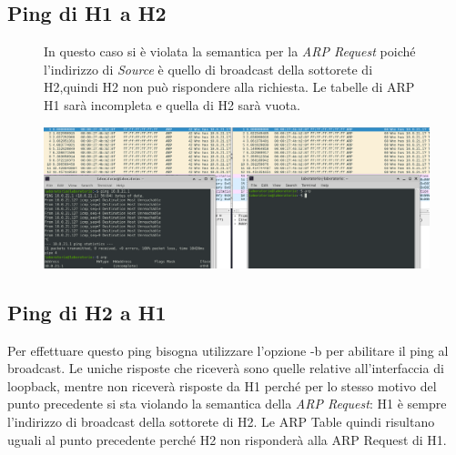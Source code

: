 \documentclass{article}
\begin{document}
 \subsection{Ping di H1 a H2}

 \begin{figure}[!htb]
    \begin{minipage}{0.2\textwidth}
        In questo caso si è violata la semantica per la \textit{ARP Request} poiché l’indirizzo di \textit{Source} è quello di broadcast della sottorete di H2,quindi H2 non può rispondere alla richiesta.
        Le tabelle di ARP H1 sarà incompleta e quella di H2 sarà vuota.  
    \end{minipage}\hfill
    \begin{minipage}{0.78\textwidth}
      \centering
      \includegraphics[width=1.05\linewidth]{es4.1.png}
    \end{minipage}
 \end{figure}

 \subsection{Ping di H2 a H1}

 Per effettuare questo ping bisogna utilizzare l’opzione -b per abilitare il ping al broadcast.
Le uniche risposte che riceverà sono quelle relative all’interfaccia di loopback, mentre non riceverà risposte da H1 perché per lo stesso motivo del punto precedente si sta violando la semantica della \textit{ARP Request}: H1 è sempre l’indirizzo di broadcast della sottorete di H2.
Le ARP Table quindi risultano uguali al punto precedente perché H2 non risponderà alla ARP Request di H1.
\end{document}
